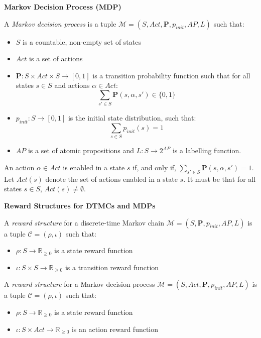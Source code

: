 {\begin{defi}
{\setlength{\parskip}{2em}
\textbf{Markov Decision Process (MDP)}\vspace{1em}\\}
{\setlength{\parskip}{1em} 

A \textit{Markov decision process} is a tuple $\mathcal{M} = (S, Act, \mathbf{P}, p_{init}, AP, L)$ such that:
\begin{itemize}
	\item $S$ is a countable, non-empty set of states
	\item $Act$ is a set of actions
	\item $\mathbf{P}: S \times Act \times S \to [0,1]$ is a transition probability function such that for all states $s \in S$ and actions $\alpha \in Act$:
		\begin{equation}
			\sum_{s' \in S} \mathbf{P}(s,\alpha,s') \in \{0,1\}
		\end{equation}
	\item $p_{init}: S \to [0,1]$ is the initial state distribution, such that:
		\begin{equation}
			\sum_{s \in S} p_{init}(s) = 1
		\end{equation}
	\item $AP$ is a set of atomic propositions and $L: S \to 2^{AP}$ is a labelling function. 
\end{itemize}

An action $\alpha \in Act$ is enabled in a state $s$ if, and only if, $\sum_{s' \in S} \mathbf{P}(s,\alpha,s') = 1$. Let $Act(s)$ denote the set of actions enabled in a state $s$. It must be that for all states $s \in S$, $Act(s) \neq \emptyset$.
}
\end{defi}}

{\begin{defi}
{\setlength{\parskip}{2em}
\textbf{Reward Structures for DTMCs and MDPs}\vspace{1em}\\}
{\setlength{\parskip}{1em} 
A \textit{reward structure} for a discrete-time Markov chain $\mathcal{M} = (S, \mathbf{P}, p_{init}, AP, L)$ is a tuple $\mathcal{C} = (\rho, \iota)$ such that:
\begin{itemize}
	\item $\rho: S \to \mathbb{R}_{\geq 0}$ is a state reward function
	\item $\iota: S \times S \to \mathbb{R}_{\geq 0}$ is a transition reward function
\end{itemize}
	
A \textit{reward structure} for a Markov decision process $\mathcal{M} = (S, Act, \mathbf{P}, p_{init}, AP, L)$ is a tuple $\mathcal{C} = (\rho, \iota)$ such that:
\begin{itemize}
	\item $\rho: S \to \mathbb{R}_{\geq 0}$ is a state reward function
	\item $\iota: S \times Act \to \mathbb{R}_{\geq 0}$ is an action reward function
\end{itemize}
}
\end{defi}}

